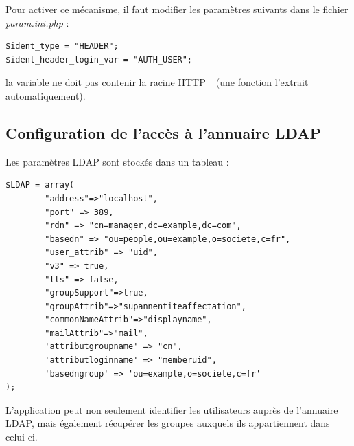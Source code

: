 Pour activer ce mécanisme, il faut modifier les paramètres suivants dans le fichier \textit{param.ini.php} :
\begin{lstlisting}
$ident_type = "HEADER";
$ident_header_login_var = "AUTH_USER";
\end{lstlisting}

la variable ne doit pas contenir la racine HTTP\_ (une fonction l'extrait automatiquement).

\subsection{Configuration de l'accès à l'annuaire LDAP}

Les paramètres LDAP sont stockés dans un tableau :
\begin{lstlisting}
$LDAP = array(
		"address"=>"localhost",
		"port" => 389,
		"rdn" => "cn=manager,dc=example,dc=com",
		"basedn" => "ou=people,ou=example,o=societe,c=fr",
		"user_attrib" => "uid",
		"v3" => true,
		"tls" => false,
		"groupSupport"=>true,
		"groupAttrib"=>"supannentiteaffectation",
		"commonNameAttrib"=>"displayname",
		"mailAttrib"=>"mail",
		'attributgroupname' => "cn",
		'attributloginname' => "memberuid",
		'basedngroup' => 'ou=example,o=societe,c=fr'
);
\end{lstlisting}


L'application peut non seulement identifier les utilisateurs auprès de l'annuaire LDAP, mais également récupérer les groupes auxquels ils appartiennent dans celui-ci.

